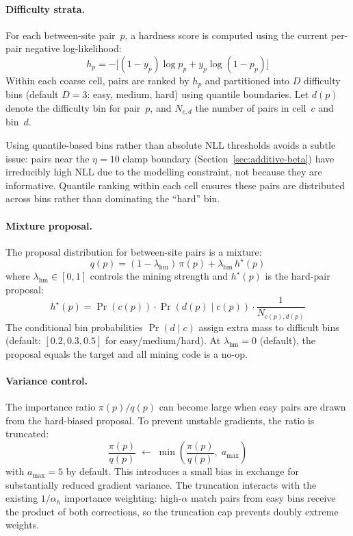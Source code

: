\documentclass{article}
\begin{document}
\paragraph{Difficulty strata.}
For each between-site pair~$p$, a hardness score is computed using the current per-pair negative log-likelihood:
\begin{equation}
    h_p = -\Big[(1-y_p)\log p_p + y_p \log(1-p_p)\Big]
\end{equation}
Within each coarse cell, pairs are ranked by $h_p$ and partitioned into $D$ difficulty bins (default $D = 3$: easy, medium, hard) using quantile boundaries. Let $d(p)$ denote the difficulty bin for pair~$p$, and $N_{c,d}$ the number of pairs in cell~$c$ and bin~$d$.

Using quantile-based bins rather than absolute NLL thresholds avoids a subtle issue: pairs near the $\eta = 10$ clamp boundary (Section~\ref{sec:additive-beta}) have irreducibly high NLL due to the modelling constraint, not because they are informative. Quantile ranking within each cell ensures these pairs are distributed across bins rather than dominating the ``hard'' bin.

\paragraph{Mixture proposal.}
The proposal distribution for between-site pairs is a mixture:
\begin{equation}
    q(p) = (1-\lambda_{\text{hm}})\,\pi(p) + \lambda_{\text{hm}}\,h^\star\!(p)
\end{equation}
where $\lambda_{\text{hm}} \in [0,1]$ controls the mining strength and $h^\star\!(p)$ is the hard-pair proposal:
\begin{equation}
    h^\star\!(p)
    =
    \Pr(c(p)) \cdot \Pr(d(p)\mid c(p)) \cdot \frac{1}{N_{c(p),d(p)}}
\end{equation}
The conditional bin probabilities $\Pr(d \mid c)$ assign extra mass to difficult bins (default: $[0.2, 0.3, 0.5]$ for easy/medium/hard). At $\lambda_{\text{hm}} = 0$ (default), the proposal equals the target and all mining code is a no-op.

\paragraph{Variance control.}
The importance ratio $\pi(p)/q(p)$ can become large when easy pairs are drawn from the hard-biased proposal. To prevent unstable gradients, the ratio is truncated:
\begin{equation}
    \frac{\pi(p)}{q(p)}
    \;\leftarrow\;
    \min\!\left(\frac{\pi(p)}{q(p)},\; a_{\max}\right)
\end{equation}
with $a_{\max} = 5$ by default. This introduces a small bias in exchange for substantially reduced gradient variance. The truncation interacts with the existing $1/\alpha_h$ importance weighting: high-$\alpha$ match pairs from easy bins receive the product of both corrections, so the truncation cap prevents doubly extreme weights.
\end{document}

